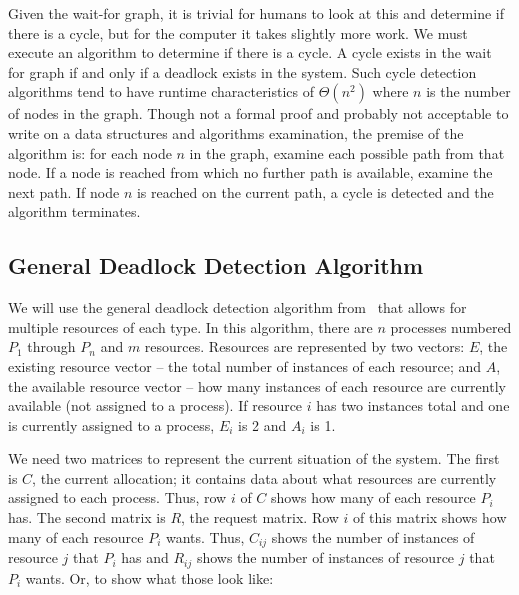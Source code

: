 Given the wait-for graph, it is trivial for humans to look at this and determine if there is a cycle, but for the computer it takes slightly more work. We must execute an algorithm to determine if there is a cycle. A cycle exists in the wait for graph if and only if a deadlock exists in the system. Such cycle detection algorithms tend to have runtime characteristics of $\Theta(n^{2})$ where $n$ is the number of nodes in the graph. Though not a formal proof and probably not acceptable to write on a data structures and algorithms examination, the premise of the algorithm is: for each node $n$ in the graph, examine each possible path from that node. If a node is reached from which no further path is available, examine the next path. If node $n$ is reached on the current path, a cycle is detected and the algorithm terminates. 

\subsection*{General Deadlock Detection Algorithm} 

We will use the general deadlock detection algorithm from~\cite{mos} that allows for multiple resources of each type. In this algorithm, there are $n$ processes numbered $P_{1}$ through $P_{n}$ and $m$ resources. Resources are represented by two vectors: $E$, the existing resource vector -- the total number of instances of each resource; and $A$, the available resource vector -- how many instances of each resource are currently available (not assigned to a process). If resource $i$ has two instances total and one is currently assigned to a process, $E_{i}$ is 2 and $A_{i}$ is 1.

We need two matrices to represent the current situation of the system. The first is $C$, the current allocation; it contains data about what resources are currently assigned to each process. Thus, row $i$ of $C$ shows how many of each resource $P_{i}$ has. The second matrix is $R$, the request matrix. Row $i$ of this matrix shows how many of each resource $P_{i}$ wants. Thus, $C_{ij}$ shows the number of instances of resource $j$ that $P_{i}$ has and $R_{ij}$ shows the number of instances of resource $j$ that $P_{i}$ wants. Or, to show what those look like:

